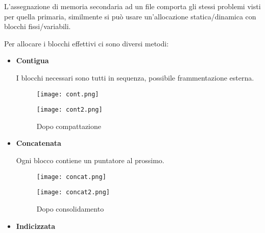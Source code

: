 \documentclass{article}
\begin{document}
\noindent L'assegnazione di memoria secondaria ad un file comporta gli stessi problemi visti per quella primaria, similmente si può usare un'allocazione statica/dinamica con blocchi fissi/variabili.\newline

\noindent Per allocare i blocchi effettivi ci sono diversi metodi:
\begin{itemize}
    \item \textbf{Contigua}

        I blocchi necessari sono tutti in sequenza, possibile frammentazione esterna.

        \begin{figure}[ht]
            \begin{minipage}[t]{0.5\textwidth}
                \centering
                \texttt{[image: cont.png]}
            \end{minipage}
            \vrule width 1pt\hspace{0.5em}
            \hfill
            \begin{minipage}[t]{0.5\textwidth}
                \centering
                \texttt{[image: cont2.png]}
                \caption*{Dopo compattazione}
            \end{minipage}
        \end{figure}

    \newpage

    \item \textbf{Concatenata}

        Ogni blocco contiene un puntatore al prossimo.

        \begin{figure}[ht]
            \begin{minipage}[t]{0.5\textwidth}
                \centering
                \texttt{[image: concat.png]}
            \end{minipage}
            \vrule width 1pt\hspace{0.5em}
            \hfill
            \begin{minipage}[t]{0.5\textwidth}
                \centering
                \texttt{[image: concat2.png]}
                \caption*{Dopo consolidamento}
            \end{minipage}
        \end{figure}

    \item \textbf{Indicizzata}


\end{itemize}
\end{document}
